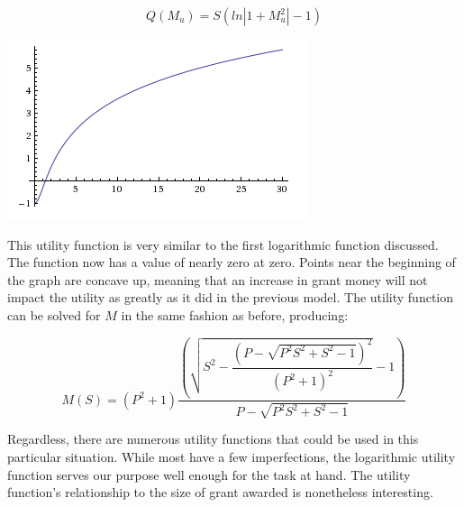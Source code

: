 \documentclass[paper.tex]{subfiles}
\begin{document}
 	$$ Q(M_u) = S(ln|1+M_u^2| - 1) $$
 	
 	\begin{center}
 		\includegraphics[width=0.5\linewidth]{images/UF3}
 	\end{center}
 	
 	This utility function is very similar to the first logarithmic function discussed. The function now has a value of nearly zero at zero. Points near the beginning of the graph are concave up, meaning that an increase in grant money will not impact the utility as greatly as it did in the previous model. The utility function can be solved for $M$ in the same fashion as before, producing:
 	
 	$$ M(S) = (P^2+1) \dfrac{\left(\sqrt{S^2 - \dfrac{(P - \sqrt{P^2S^2 + S^2 - 1})^2}{(P^2 + 1)^2}} -1\right)}{P - \sqrt{P^2S^2 + S^2 - 1}}$$
	
	Regardless, there are numerous utility functions that could be used in this particular situation. While most have a few imperfections, the logarithmic utility function serves our purpose well enough for the task at hand. The utility function's relationship to the size of grant awarded is nonetheless interesting.
\end{document}
